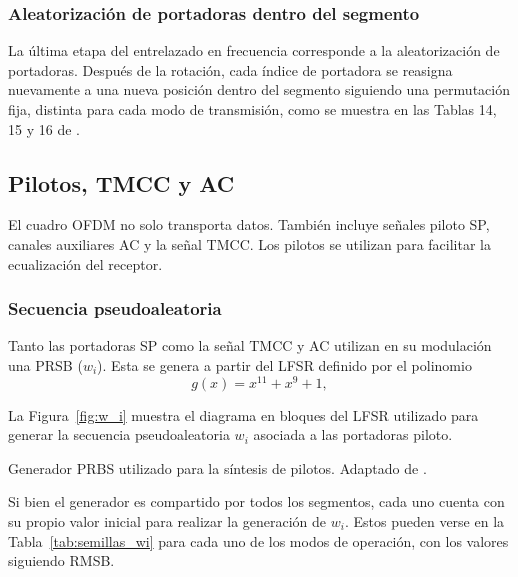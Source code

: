 \subsubsection{Aleatorización de portadoras dentro del segmento}
\label{subsubsec:aleatorizacion_portadoras}
La última etapa del entrelazado en frecuencia corresponde a la aleatorización de portadoras. Después de la rotación, cada índice de portadora se reasigna nuevamente a una nueva posición dentro del segmento siguiendo una permutación fija, distinta para cada modo de transmisión, como se muestra en las Tablas 14, 15 y 16 de \cite{abnt}.

\subsection{Pilotos, TMCC y AC}

El cuadro OFDM no solo transporta datos. También incluye señales piloto SP, canales auxiliares AC y la señal TMCC. Los pilotos se utilizan para facilitar la ecualización del receptor.

\subsubsection{Secuencia pseudoaleatoria}
Tanto las portadoras SP como la señal TMCC y AC utilizan en su modulación una PRSB ($w_i$). Esta se genera a partir del LFSR definido por el polinomio
\begin{equation}
g(x)=x^{11}+x^9+1,
\end{equation}

La Figura~\ref{fig:w_i} muestra el diagrama en bloques del LFSR utilizado para generar la secuencia pseudoaleatoria $w_i$ asociada a las portadoras piloto.

{Generador PRBS utilizado para la síntesis de pilotos.}
{Adaptado de \cite{isdbt}.}
{\label{fig:w_i}}

Si bien el generador es compartido por todos los segmentos, cada uno cuenta con su propio valor inicial para realizar la generación de $w_i$. Estos pueden verse en la Tabla~\ref{tab:semillas_wi} para cada uno de los modos de operación, con los valores siguiendo RMSB.

